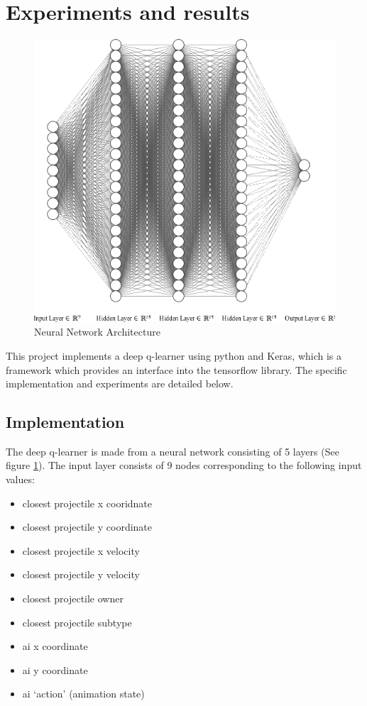 \documentclass{article}
\begin{document}
\section{Experiments and results}
\begin{figure}[ht]
    \centering
    \includegraphics[width=\textwidth]{nn}
    \caption{Neural Network Architecture}
    \label{fig:nn}
\end{figure}
This project implements a deep q-learner using python and Keras, which is a framework which provides an interface
into the tensorflow library. The specific implementation and experiments are detailed below.
\subsection{Implementation}
The deep q-learner is made from a neural network consisting of 5 layers (See figure \ref{fig:nn}). The input layer consists of 9 nodes corresponding to the following input values:
\begin{itemize}
\item closest projectile x cooridnate
\item closest projectile y coordinate
\item closest projectile x velocity
\item closest projectile y velocity
\item closest projectile owner
\item closest projectile subtype
\item ai x coordinate
\item ai y coordinate
\item ai `action' (animation state)
\end{itemize}
\end{document}
